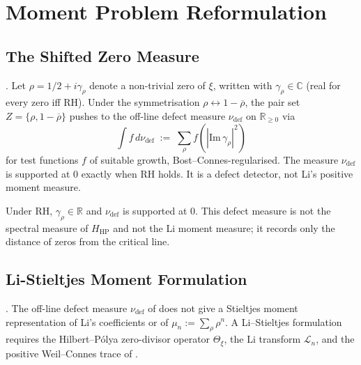 \section{Moment Problem Reformulation}
\label{v4-arith:vb:moment}

\subsection{The Shifted Zero Measure}
\label{v4-arith:vb:shifted-measure}

\begin{definition}
\label{v4-arith:vb:def:zero-measure}
\ClaimStatusDefinitional. Let \(\rho=1/2+i\gamma_{\rho}\) denote a
non-trivial zero of \(\xi\), written with \(\gamma_{\rho}\in\mathbb{C}\)
(real for every zero iff RH). Under the symmetrisation
\(\rho\leftrightarrow 1-\overline{\rho}\), the pair set
\(Z=\{\rho,1-\overline{\rho}\}\) pushes to the off-line defect measure
\(\nu_{\mathrm{def}}\) on \(\mathbb{R}_{\geq0}\) via
\begin{equation}
\int f\,d\nu_{\mathrm{def}}\;:=\;\sum_{\rho}f(|\mathrm{Im}\,\gamma_{\rho}|^{2})
\end{equation}
for test functions \(f\) of suitable growth, Bost--Connes-regularised.
The measure \(\nu_{\mathrm{def}}\) is supported at \(0\) exactly when
RH holds. It is a defect detector, not Li's positive moment measure.
\end{definition}

\begin{remark}
Under RH, \(\gamma_{\rho}\in\mathbb{R}\) and
\(\nu_{\mathrm{def}}\) is supported at \(0\). This defect measure is
not the spectral measure of \(H_{\mathrm{HP}}\) and not the Li moment
measure; it records only the distance of zeros from the critical
line.
\end{remark}

\subsection{Li-Stieltjes Moment Formulation}
\label{v4-arith:vb:li-stieltjes}

\begin{proposition}
\label{v4-arith:vb:prop:li-stieltjes}
\ClaimStatusProvedHere. The off-line defect measure
\(\nu_{\mathrm{def}}\) of  does
not give a Stieltjes moment representation of Li's coefficients or of
\(\mu_{n}:=\sum_{\rho}\rho^{n}\). A Li--Stieltjes formulation requires
the Hilbert--P\'olya zero-divisor operator \(\Theta_{\xi}\), the Li transform
\(\mathcal L_n\), and the positive Weil--Connes trace of
.
\end{proposition}

